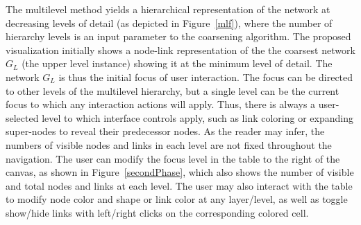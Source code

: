 \documentclass[runningheads]{llncs}
\begin{document}
The multilevel method yields a hierarchical representation of the network at decreasing levels of detail (as depicted in Figure~\ref{mlf}), where the number of hierarchy levels is an input parameter to the coarsening algorithm. The proposed visualization initially shows a node-link representation of the the coarsest network $G_L$ (the upper level instance) showing it at the minimum level of detail. The network $G_L$ is thus the initial focus of user interaction. The focus can be directed to other levels of the multilevel hierarchy, but a single level can be the current focus to which any interaction actions will apply.
Thus, there is always a user-selected level to which interface controls apply, such as link coloring or expanding super-nodes to reveal their predecessor nodes.
As the reader may infer, the numbers of visible nodes and links in each level are not fixed throughout the navigation.
The user can modify the focus level in the table to the right of the canvas, as shown in Figure~\ref{secondPhase}, which also shows the number of visible and total nodes and links at each level.
The user may also interact with the table to modify node color and shape or link color at any layer/level, as well as toggle show/hide links with left/right clicks on the corresponding colored cell.
\end{document}
